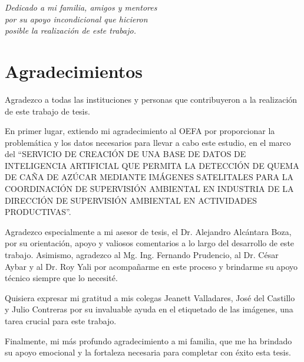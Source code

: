 \newpage
\vspace*{\fill}
\begin{flushright}
    \small{\textit{Dedicado a mi familia, amigos y mentores}}\\
    \small{\textit{por su apoyo incondicional que hicieron}} \\
    \small{\textit{posible la realización de este trabajo.}}
\end{flushright}
\vspace{1cm}
\thispagestyle{empty}

\newpage
\section*{Agradecimientos}

Agradezco a todas las instituciones y personas que contribuyeron a la realización de este trabajo de tesis.

En primer lugar, extiendo mi agradecimiento al OEFA por proporcionar la problemática y los datos necesarios para llevar a cabo este estudio, en el marco del ``SERVICIO DE CREACIÓN DE UNA BASE DE DATOS DE INTELIGENCIA ARTIFICIAL QUE PERMITA LA DETECCIÓN DE QUEMA DE CAÑA DE AZÚCAR MEDIANTE IMÁGENES SATELITALES PARA LA COORDINACIÓN DE SUPERVISIÓN AMBIENTAL EN INDUSTRIA DE LA DIRECCIÓN DE SUPERVISIÓN AMBIENTAL EN ACTIVIDADES PRODUCTIVAS''.

Agradezco especialmente a mi asesor de tesis, el Dr. Alejandro Alcántara Boza, por su orientación, apoyo y valiosos comentarios a lo largo del desarrollo de este trabajo. Asimismo, agradezco al Mg. Ing. Fernando Prudencio, al Dr. César Aybar y al Dr. Roy Yali por acompañarme en este proceso y brindarme su apoyo técnico siempre que lo necesité.

Quisiera expresar mi gratitud a mis colegas Jeanett Valladares, José del Castillo y Julio Contreras por su invaluable ayuda en el etiquetado de las imágenes, una tarea crucial para este trabajo.

Finalmente, mi más profundo agradecimiento a mi familia, que me ha brindado su apoyo emocional y la fortaleza necesaria para completar con éxito esta tesis.


